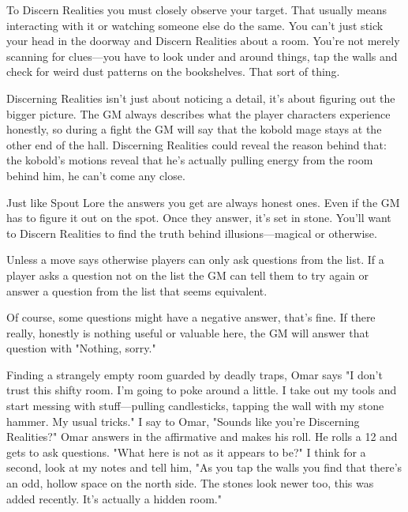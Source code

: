 To Discern Realities you must closely observe your target. That usually means interacting with it or watching someone else do the same. You can't just stick your head in the doorway and Discern Realities about a room. You're not merely scanning for clues—you have to look under and around things, tap the walls and check for weird dust patterns on the bookshelves. That sort of thing.

       

Discerning Realities isn't just about noticing a detail, it's about figuring out the bigger picture. The GM always describes what the player characters experience honestly, so during a fight the GM will say that the kobold mage stays at the other end of the hall. Discerning Realities could reveal the reason behind that: the kobold's motions reveal that he's actually pulling energy from the room behind him, he can't come any close.

       

Just like Spout Lore the answers you get are always honest ones. Even if the GM has to figure it out on the spot. Once they answer, it's set in stone. You'll want to Discern Realities to find the truth behind illusions—magical or otherwise.

       

Unless a move says otherwise players can only ask questions from the list. If a player asks a question not on the list the GM can tell them to try again or answer a question from the list that seems equivalent.

       

Of course, some questions might have a negative answer, that's fine. If there really, honestly is nothing useful or valuable here, the GM will answer that question with "Nothing, sorry."

       
\startExample
Finding a strangely empty room guarded by deadly traps, Omar says "I don't trust this shifty room. I'm going to poke around a little. I take out my tools and start messing with stuff—pulling candlesticks, tapping the wall with my stone hammer. My usual tricks." I say to Omar, "Sounds like you're Discerning Realities?" Omar answers in the affirmative and makes his roll. He rolls a 12 and gets to ask questions. "What here is not as it appears to be?" I think for a second, look at my notes and tell him, "As you tap the walls you find that there's an odd, hollow space on the north side. The stones look newer too, this was added recently. It's actually a hidden room."
\stopExample
       

